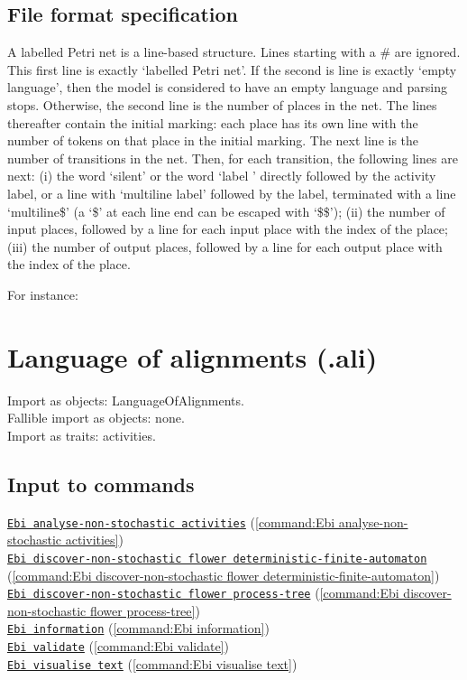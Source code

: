 {\subsection*{File format specification}A labelled Petri net is a line-based structure. Lines starting with a \# are ignored.
    This first line is exactly `labelled Petri net'.
    If the second is line is exactly `empty language', then the model is considered to have an empty language and parsing stops.
    Otherwise, the second line is the number of places in the net.
    The lines thereafter contain the initial marking: each place has its own line with the number of tokens on that place in the initial marking.
    The next line is the number of transitions in the net.
    Then, for each transition, the following lines are next: 
    (i) the word `silent' or the word `label ' directly followed by the activity label, or a line with `multiline label' followed by the label, terminated with a line `multiline\$' (a `\$' at each line end can be escaped with `\$\$');
    (ii) the number of input places, followed by a line for each input place with the index of the place;
    (iii) the number of output places, followed by a line for each output place with the index of the place.
    
    For instance:
    
\clearpage
\section{Language of alignments (.ali)}
\label{filehandler:language of alignments}
Import as objects: LanguageOfAlignments.
\\Fallible import as objects: none.
\\Import as traits: activities.
\subsection*{Input to commands} \null\qquad\hyperref[command:Ebi analyse-non-stochastic activities]{\texttt{Ebi analyse-non-stochastic activities}} (\cref{command:Ebi analyse-non-stochastic activities})\\\null\qquad\hyperref[command:Ebi discover-non-stochastic flower deterministic-finite-automaton]{\texttt{Ebi discover-non-stochastic flower deterministic-finite-automaton}} (\cref{command:Ebi discover-non-stochastic flower deterministic-finite-automaton})\\\null\qquad\hyperref[command:Ebi discover-non-stochastic flower process-tree]{\texttt{Ebi discover-non-stochastic flower process-tree}} (\cref{command:Ebi discover-non-stochastic flower process-tree})\\\null\qquad\hyperref[command:Ebi information]{\texttt{Ebi information}} (\cref{command:Ebi information})\\\null\qquad\hyperref[command:Ebi validate]{\texttt{Ebi validate}} (\cref{command:Ebi validate})\\\null\qquad\hyperref[command:Ebi visualise text]{\texttt{Ebi visualise text}} (\cref{command:Ebi visualise text})
}

